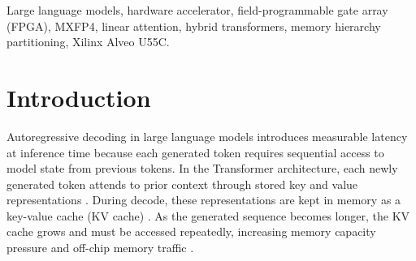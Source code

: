 % 

\begin{abstract}
Large language models (LLMs) face increasing latency and energy costs during
autoregressive decoding because attention state and recurrent state must be
accessed repeatedly during token generation. Hybrid architectures such as
Qwen3-Next reduce part of the full-attention memory burden by using Gated
DeltaNet layers, but efficient hardware support is still needed for the fixed
recurrent state used by these layers. This work presents a simulation-only
native Open Compute Project (OCP) Microscaling FP4 (MXFP4) persistent-state
datapath for one batch-one Gated DeltaNet decode layer on a Xilinx Alveo U55C
field-programmable gate array (FPGA). The design uses block-scaled FP4 values
with shared block exponents and keeps the recurrent state on chip during decode.

The default MXFP4 implementation achieves \OursMxfpFourBThirtyTwoLatencyUs per
token in register-transfer level (RTL) cosimulation and consumes
\OursMxfpFourBThirtyTwoPowerW after Vivado implementation. Compared with the
cited H100 baseline, this corresponds to \HeadlineSpeedupVsHOneHundred speedup
and \HeadlineEnergyEfficiencyVsHOneHundred improvement in energy efficiency.
Compared with the cited FPGA baseline, the design achieves
\HeadlineSpeedupVsUsc speedup and \HeadlineEnergyEfficiencyVsUsc improvement in
energy efficiency. Current numerical-quality evidence is based on deterministic
synthetic tests; realistic Qwen3-Next activation capture is still required
before claiming full-model perplexity or final model quality.
\end{abstract}

\begin{IEEEkeywords}
Large language models, hardware accelerator, field-programmable gate array
(FPGA), MXFP4, linear attention, hybrid transformers, memory hierarchy
partitioning, Xilinx Alveo U55C.
\end{IEEEkeywords}

\section{Introduction}
Autoregressive decoding in large language models introduces measurable latency
at inference time because each generated token requires sequential access to
model state from previous tokens. In the Transformer architecture, each newly
generated token attends to prior context through stored key and value
representations \cite{b2}. During decode, these representations are kept in
memory as a key-value cache (KV cache) \cite{b6}. As the generated sequence
becomes longer, the KV cache grows and must be accessed repeatedly, increasing
memory capacity pressure and off-chip memory traffic \cite{b7}.

